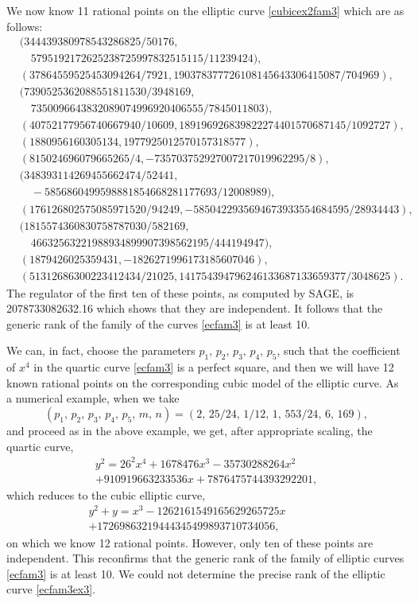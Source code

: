 \documentclass[11pt, leqno]{article}
\begin{document}
We now know  11  rational points on the elliptic curve \eqref{cubicex2fam3} which are as follows:
\begin{equation*}
\begin{aligned}
&(344439380978543286825/50176, \\
& \quad 5795192172625238725997832515115/11239424), \\ 
&(37864559525453094264/7921, 190378377726108145643306415087/704969), \\
&(7390525362088551811530/3948169, \\
& \quad  7350096643832089074996920406555/7845011803), \\ 
&(40752177956740667940/10609,  189196926839822274401570687145/1092727), \\  
&(1880956160305134, 1977925012570157318577), \\
&(815024696079665265/4,  -735703752927007217019962295/8), \\  
&(348393114269455662474/52441, \\
& \quad  -5856860499598881854668281177693/12008989), \\  
&(176126802575085971520/94249,  -5850422935694673933554684595/28934443), \\
&(1815574360830758787030/582169, \\
& \quad  46632563221988934899907398562195/444194947), \\
&(1879426025359431, -1826271996173185607046), \\
&(51312686300223412434/21025,  141754394796246133687133659377/3048625).
\end{aligned}
\end{equation*}
The regulator of the first ten of these points, as computed by SAGE, is 2078733082632.16 which shows that they are independent. It follows that the generic rank of the family of the curves \eqref{ecfam3} is at least 10.

We can, in fact, choose the parameters $p_1,\,p_2,\,p_3,\,p_4,\,p_5$, such that the coefficient of $x^4$ in the quartic curve \eqref{ecfam3} is a perfect square, and then we will have 12 known rational points on the corresponding cubic model of the elliptic curve. As a numerical example, when we take 
\[(p_1,\,p_2,\,p_3,\,p_4,\,p_5,\,m,\,n)=(2,\,25/24,\,1/12,\,1,\,553/24,\,6,\,169),\]
and proceed as in the above example, we get, after appropriate scaling, the quartic curve,
\begin{multline}
y^2=26^2x^4+1678476x^3-35730288264x^2\\
+910919663233536x+7876475744393292201,
\end{multline}
which reduces to the cubic elliptic curve,
\begin{multline}
y^2 + y = x^3 - 1262161549165629265725x \\
 + 17269863219444345499893710734056, \quad \quad \quad \quad  \label{ecfam3ex3}
\end{multline}
on which we know  12 rational points. However, only ten of these points are independent. This reconfirms that the generic rank of the family of elliptic curves \eqref{ecfam3} is at least 10. We could not determine the precise rank of the elliptic curve \eqref{ecfam3ex3}.
\end{document}
